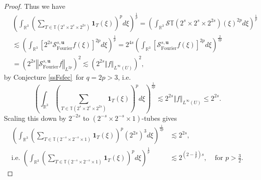 \documentclass{amsart}%
\theoremstyle{plain}
\numberwithin{equation}{section}
\begin{document}
\begin{proof}
Thus we have%
\begin{align*}
&  \left(  \int_{\mathbb{R}^{3}}\left(  \sum_{T\in\mathbb{T}\left(
2^{s}\times2^{s}\times2^{2s}\right)  }\mathbf{1}_{T}\left(  \xi\right)
\right)  ^{p}d\xi\right)  ^{\frac{1}{p}}=\left(  \int_{\mathbb{R}^{3}%
}\mathcal{S}\mathbb{T}\left(  2^{s}\times2^{s}\times2^{2s}\right)  \left(
\xi\right)  ^{2p}d\xi\right)  ^{\frac{1}{p}}\\
&  \lesssim\left(  \int_{\mathbb{R}^{3}}\left[  2^{2s}\mathcal{S}%
_{\operatorname*{Fourier}}^{s,\mathbf{u}}f\left(  \xi\right)  \right]
^{2p}d\xi\right)  ^{\frac{1}{p}}=2^{4s}\left(  \int_{\mathbb{R}^{3}}\left[
\mathcal{S}_{\operatorname*{Fourier}}^{s,\mathbf{u}}f\left(  \xi\right)
\right]  ^{2p}d\xi\right)  ^{\frac{2}{2p}}\\
&  =\left(  2^{2s}\left\Vert \mathcal{S}_{\operatorname*{Fourier}%
}^{s,\mathbf{u}}f\right\Vert _{L^{2p}}\right)  ^{2}\lesssim\left(
2^{2s}\left\Vert f\right\Vert _{L^{\infty}\left(  U\right)  }\right)  ^{2},
\end{align*}
by Conjecture \ref{ssFsfec}\ for $q=2p>3$, i.e.%
\[
\left(  \int_{\mathbb{R}^{3}}\left(  \sum_{T\in\mathbb{T}\left(  2^{s}%
\times2^{s}\times2^{2s}\right)  }\mathbf{1}_{T}\left(  \xi\right)  \right)
^{p}d\xi\right)  ^{\frac{1}{2p}}\lesssim2^{2s}\left\Vert f\right\Vert
_{L^{\infty}\left(  U\right)  }\leq2^{2s}.
\]
Scaling this down by $2^{-2s}$ to $\left(  2^{-s}\times2^{-s}\times1\right)
$-tubes gives%
\begin{align*}
\left(  \int_{\mathbb{R}^{3}}\left(  \sum_{T\in\mathbb{T}\left(  2^{-s}%
\times2^{-s}\times1\right)  }\mathbf{1}_{T}\left(  \xi\right)  \right)
^{p}\left(  2^{2s}\right)  ^{3}d\xi\right)  ^{\frac{1}{2p}}  &  \lesssim
2^{2s},\\
\text{i.e. }\left(  \int_{\mathbb{R}^{3}}\left(  \sum_{T\in\mathbb{T}\left(
2^{-s}\times2^{-s}\times1\right)  }\mathbf{1}_{T}\left(  \xi\right)  \right)
^{p}d\xi\right)  ^{\frac{1}{p}}  &  \lesssim2^{\left(  2-\frac{3}{p}\right)
s},\ \ \ \ \ \text{for }p>\frac{3}{2}.
\end{align*}



\end{proof}
\end{document}
